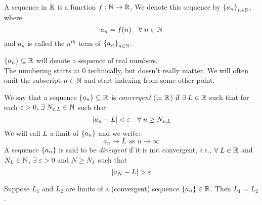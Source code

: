 \documentclass[12pt]{article}
\begin{document}
\begin{defn} \label{defn:sequence}
    A sequence in $\mathbb{R}$ is a function $f: \mathbb{N} \to \mathbb{R}$. We denote this sequence by $\set{a_{n}}_{n \in \N}$, where \[
        a_{n} = f(n) \quad \forall\; n \in \mathbb{N}
    \] and $a_{n}$ is called the $n^{th}$ term of $\set{a_{n}}_{n \in \N}$.
\end{defn}

\begin{rem}
    $\set{a_{n}} \subseteq \R$ will denote a sequence of real numbers. \\
    The numbering starts at 0 technically, but doesn't really matter. We will often omit the subscript $n \in \mathbb{N}$ and start indexing from some other point.
\end{rem}

\begin{defn} \label{defn:convergent seq}
    We say that a sequence $\set{a_{n}} \subseteq \R$ is \emph{convergent} (in $\mathbb{R}$) if $\exists\; L \in \mathbb{R}$ such that for each $\varepsilon > 0, \,\exists\; N_{\varepsilon,L} \in \mathbb{N}$ such that \[
        \abs{ a_{n} - L } < \varepsilon \quad \forall\; n \geq N_{\varepsilon, L}
    \] 
    We will call $L$ \emph{a} limit of $\set{a_{n}}$ and we write: \[
        a_{n} \to L \text{ as } n \to \infty
    \]
    A sequence $\set{a_{n}}$ is said to be \emph{divergent} if it is not convergent, \textit{i.e.}, $\forall\; L \in \mathbb{R}$ and $N_{L} \in \mathbb{N}$, $\exists\; \varepsilon > 0$ and $N \geq N_{L}$ such that \[
        \abs{ a_{N} - L } > \varepsilon
    \]
\end{defn}

\begin{thm} \label{thm:unique limit}
    Suppose $L_{1}$ and $L_{2}$ are limits of a (convergent) sequence $\set{a_{n}} \in \R$. Then $L_{1} = L_{2}$.
\end{thm}
\end{document}
